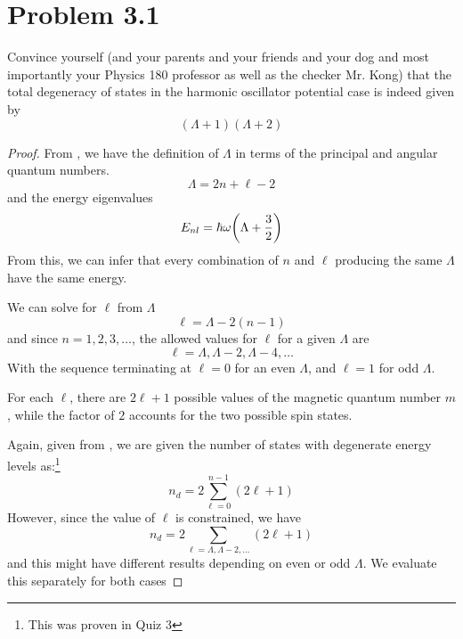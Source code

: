 \documentclass[12pt,a4paper]{article}
\begin{document}
	
	\section*{
		Problem 3.1
	}
	\begin{problem}
		Convince yourself (and your parents and your friends and your dog
		and most importantly your Physics 180 professor as well as the checker
		Mr. Kong) that the total degeneracy of states in the harmonic oscillator
		potential case is indeed given by
		\begin{equation}
			(\Lambda + 1)(\Lambda + 2)
		\end{equation}
	\end{problem}
	\begin{solution_pset}
		\begin{proof}
			From \cite{flores2026}, we have the definition of $\Lambda$ in terms of the principal and 
			angular quantum numbers.
			\begin{equation}
				\Lambda = 2n + \ell -2
			\end{equation}
			and the energy eigenvalues
			\begin{equation}
				E_{nl} = \hbar \omega \pqty{\Lambda + \frac{3}{2}}
			\end{equation}
			From this, we can infer that every combination of $n$ and $\ell$ producing the same
			$\Lambda$ have the same energy. 

			We can solve for $\ell$ from $\Lambda$
			\begin{equation}
				\ell = \Lambda - 2(n-1)
			\end{equation}
			and since $n=1,2,3,\ldots$, the allowed values for $\ell$ for a given $\Lambda$ are
			\[
				\ell = \Lambda, \Lambda - 2, \Lambda - 4, \ldots
			\]
			With the sequence terminating at $\ell=0$ for an even $\Lambda$, and $\ell=1$ for odd $\Lambda$.
			
			For each $\ell$, there are $2\ell + 1$ possible values of the magnetic quantum number $m$, while
			the factor of $2$ accounts for the two possible spin states. 

			Again, given from \cite{flores2026}, we are given the number of states with degenerate energy levels as:\footnote{This was proven in Quiz 3}
			\begin{equation}
				n_d = 2 \sum_{\ell=0}^{n-1}(2\ell+1)
			\end{equation}
			However, since the value of $\ell$ is constrained, we have
			\begin{equation}
				\label{eq:nd2}
				n_d = 2 \sum_{\ell=\Lambda, \Lambda-2,\ldots}(2\ell+1)
			\end{equation}
			and this might have different results depending on even or odd $\Lambda$. We evaluate this separately for both cases


\end{proof}
\end{solution_pset}
\end{document}
